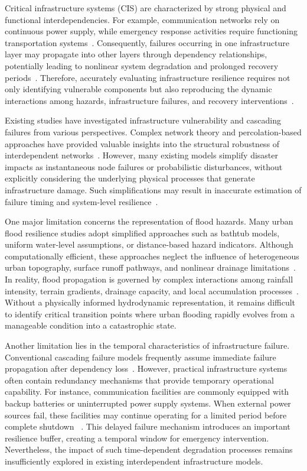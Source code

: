 \documentclass[preprint,12pt]{elsarticle}
\begin{document}
Critical infrastructure systems (CIS) are characterized by strong physical
and functional interdependencies. For example, communication networks rely
on continuous power supply, while emergency response activities require
functioning transportation systems~\cite{ouyang2014review}. Consequently,
failures occurring in one infrastructure layer may propagate into other
layers through dependency relationships, potentially leading to nonlinear
system degradation and prolonged recovery periods~\cite{ouyang2012three}.
Therefore, accurately evaluating infrastructure resilience requires not only
identifying vulnerable components but also reproducing the dynamic
interactions among hazards, infrastructure failures, and recovery
interventions~\cite{bruneau2003framework,chang2004measuring}.

Existing studies have investigated infrastructure vulnerability and cascading
failures from various perspectives. Complex network theory and
percolation-based approaches have provided valuable insights into the
structural robustness of interdependent
networks~\cite{albert2002statistical,newman2003structure,gao2011robustness}.
However, many existing models simplify disaster impacts as instantaneous node
failures or probabilistic disturbances, without explicitly considering the
underlying physical processes that generate infrastructure damage. Such
simplifications may result in inaccurate estimation of failure timing and
system-level resilience~\cite{ouyang2012time}.

One major limitation concerns the representation of flood hazards. Many urban
flood resilience studies adopt simplified approaches such as bathtub models,
uniform water-level assumptions, or distance-based hazard indicators.
Although computationally efficient, these approaches neglect the influence of
heterogeneous urban topography, surface runoff pathways, and nonlinear
drainage limitations~\cite{bates2010simple}. In reality, flood propagation is
governed by complex interactions among rainfall intensity, terrain gradients,
drainage capacity, and local accumulation processes~\cite{guidolin2016weighted,
ghimire2013formulation}. Without a physically informed hydrodynamic
representation, it remains difficult to identify critical transition points
where urban flooding rapidly evolves from a manageable condition into a
catastrophic state.

Another limitation lies in the temporal characteristics of infrastructure
failure. Conventional cascading failure models frequently assume immediate
failure propagation after dependency loss~\cite{buldyrev2010catastrophic}.
However, practical infrastructure systems often contain redundancy mechanisms
that provide temporary operational capability. For instance, communication
facilities are commonly equipped with backup batteries or uninterrupted power
supply systems. When external power sources fail, these facilities may
continue operating for a limited period before complete shutdown
~\cite{panteli2015grid}. This delayed failure mechanism introduces an
important resilience buffer, creating a temporal window for emergency
intervention. Nevertheless, the impact of such time-dependent degradation
processes remains insufficiently explored in existing interdependent
infrastructure models.
\end{document}
